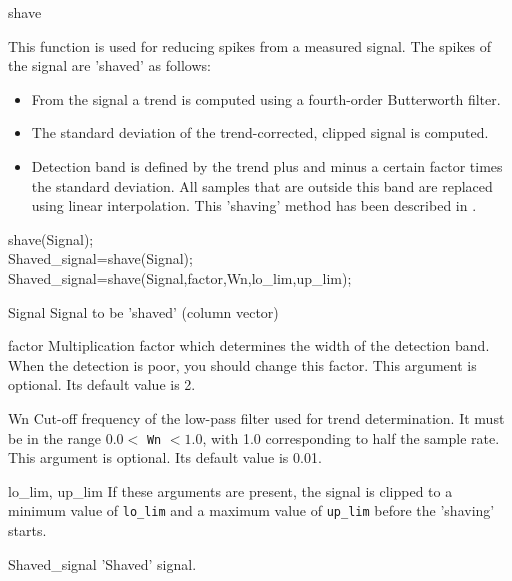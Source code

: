 \documentclass{book}
\begin{document}
\begin{command}{shave}
\begin{purpose}
  This function is used for reducing spikes from a measured signal.
  The spikes of the signal are 'shaved' as follows:
\begin{itemize}
\item From the signal a trend is computed using a fourth-order
  Butterworth filter.
\item The standard deviation of the trend-corrected, clipped signal is
  computed.
\item Detection band is defined by the trend plus and minus a certain
  factor times the standard deviation. All samples that are outside
  this band are replaced using linear interpolation.  This 'shaving'
  method has been described in \cite{Backx87}.
\end{itemize}
\end{purpose}

\begin{syntax} 
shave(Signal);\\
Shaved\_signal=shave(Signal);\\
Shaved\_signal=shave(Signal,factor,Wn,lo\_lim,up\_lim);
\end{syntax}

\begin{inputs}
\item[Signal] Signal to be 'shaved' (column vector)
\item[factor] Multiplication factor which determines the width of the
  detection band. When the detection is poor, you should change this
  factor. This argument is optional.  Its default value is 2.
\item[Wn] Cut-off frequency of the low-pass filter used for trend
  determination.  It must be in the range $0.0 < $ \verb+Wn+ $< 1.0$,
  with 1.0 corresponding to half the sample rate. This argument is
  optional. Its default value is 0.01.
\item[lo\_lim, up\_lim] If these arguments are present, the signal is
  clipped to a minimum value of \verb+lo_lim+ and a maximum value of
  \verb+up_lim+ before the 'shaving' starts.

\end{inputs}
\begin{outputs}
\item[Shaved\_signal] 'Shaved' signal.
\end{outputs}

\begin{seealso}
\mbox{}
\end{seealso}
\end{command}%
\end{document}
